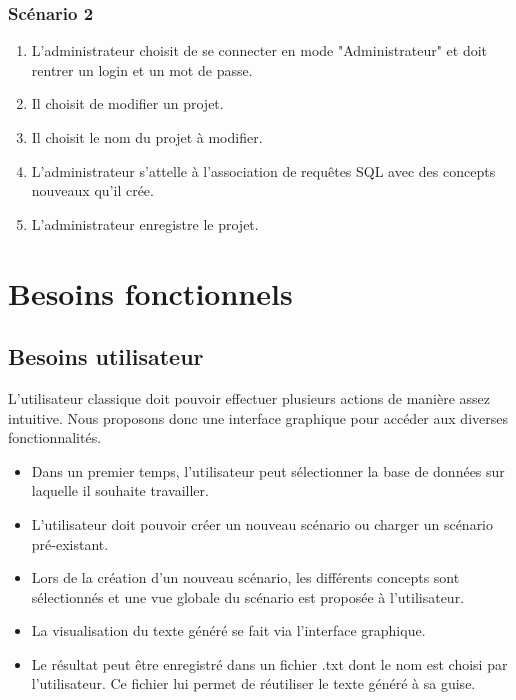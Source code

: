 \documentclass[12pt]{report}
\begin{document}
\subsubsection{Scénario 2}   
    \begin{enumerate}
    \item L'administrateur choisit de se connecter en mode "Administrateur" et doit rentrer un login et un mot de passe.
    		\item Il choisit de modifier un projet.
            \item Il choisit le nom du projet à modifier.
            \item L'administrateur s'attelle à l'association de requêtes SQL avec des concepts nouveaux qu'il crée.
            \item L'administrateur enregistre le projet.
            \end{enumerate}


\section{Besoins fonctionnels}

\subsection{Besoins utilisateur}

L'utilisateur classique doit pouvoir effectuer plusieurs actions de manière assez intuitive. Nous proposons donc une interface graphique pour accéder aux diverses fonctionnalités.

	\begin{itemize}
	\item Dans un premier temps, l'utilisateur peut sélectionner la base de données sur laquelle il souhaite travailler.
	\item L'utilisateur doit pouvoir créer un nouveau scénario ou charger un scénario pré-existant.
	\item Lors de la création d'un nouveau scénario, les différents concepts sont sélectionnés et une vue globale du scénario est proposée à l'utilisateur.
	\item La visualisation du texte généré se fait via l'interface graphique.
	\item Le résultat peut être enregistré dans un fichier .txt dont le nom est choisi par l'utilisateur. Ce fichier lui permet de réutiliser le texte généré à sa guise.
	\end{itemize}
\end{document}
